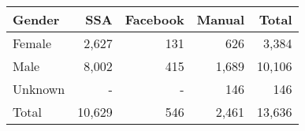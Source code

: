 
\begin{tabular}{lrrrr}
\toprule
Gender & SSA & Facebook & Manual & Total\\
\midrule
Female & 2,627 & 131 & 626 & 3,384\\
Male & 8,002 & 415 & 1,689 & 10,106\\
Unknown & - & - & 146 & 146\\
\midrule
Total & 10,629 & 546 & 2,461 & 13,636\\
\bottomrule
\end{tabular}
